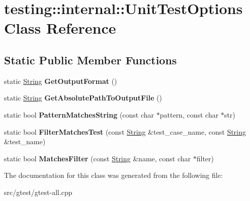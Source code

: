 \hypertarget{classtesting_1_1internal_1_1_unit_test_options}{}\section{testing\+:\+:internal\+:\+:Unit\+Test\+Options Class Reference}
\label{classtesting_1_1internal_1_1_unit_test_options}
\subsection*{Static Public Member Functions}
\begin{DoxyCompactItemize}
\item 
\mbox{\label{classtesting_1_1internal_1_1_unit_test_options_a380d418b19645d8a29807b1e72ee05ec}} 
static \mbox{\hyperlink{classtesting_1_1internal_1_1_string}{String}} {\bfseries Get\+Output\+Format} ()
\item 
\mbox{\label{classtesting_1_1internal_1_1_unit_test_options_a944039f275e5fa5d9c238f2a76fee6e0}} 
static \mbox{\hyperlink{classtesting_1_1internal_1_1_string}{String}} {\bfseries Get\+Absolute\+Path\+To\+Output\+File} ()
\item 
\mbox{\label{classtesting_1_1internal_1_1_unit_test_options_af0235a2ee26dd6db21305e11d2358e4f}} 
static bool {\bfseries Pattern\+Matches\+String} (const char $\ast$pattern, const char $\ast$str)
\item 
\mbox{\label{classtesting_1_1internal_1_1_unit_test_options_afbd3215a48b440132a0196344f807120}} 
static bool {\bfseries Filter\+Matches\+Test} (const \mbox{\hyperlink{classtesting_1_1internal_1_1_string}{String}} \&test\+\_\+case\+\_\+name, const \mbox{\hyperlink{classtesting_1_1internal_1_1_string}{String}} \&test\+\_\+name)
\item 
\mbox{\label{classtesting_1_1internal_1_1_unit_test_options_acc81ee7b385389cbb475c939a8f473bd}} 
static bool {\bfseries Matches\+Filter} (const \mbox{\hyperlink{classtesting_1_1internal_1_1_string}{String}} \&name, const char $\ast$filter)
\end{DoxyCompactItemize}


The documentation for this class was generated from the following file\+:\begin{DoxyCompactItemize}
\item 
src/gtest/gtest-\/all.\+cpp\end{DoxyCompactItemize}
